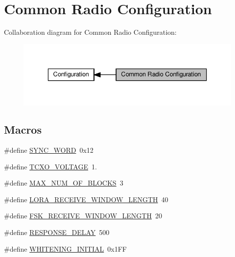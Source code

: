 \hypertarget{group__defines__radio__common__configuraiton}{}\section{Common Radio Configuration}
\label{group__defines__radio__common__configuraiton}
Collaboration diagram for Common Radio Configuration\+:
\nopagebreak
\begin{figure}[H]
\begin{center}
\leavevmode
\includegraphics[width=336pt]{group__defines__radio__common__configuraiton}
\end{center}
\end{figure}
\subsection*{Macros}
\begin{DoxyCompactItemize}
\item 
\#define \hyperlink{group__defines__radio__common__configuraiton_ga3e9af6b370e370158949ba1f4d064a38}{S\+Y\+N\+C\+\_\+\+W\+O\+RD}~0x12
\item 
\#define \hyperlink{group__defines__radio__common__configuraiton_gaed963c48ead7d4a77519f1d09cffa16c}{T\+C\+X\+O\+\_\+\+V\+O\+L\+T\+A\+GE}~1.
\item 
\#define \hyperlink{group__defines__radio__common__configuraiton_ga89986fbe657f799f601b5b92f7632ece}{M\+A\+X\+\_\+\+N\+U\+M\+\_\+\+O\+F\+\_\+\+B\+L\+O\+C\+KS}~3
\item 
\#define \hyperlink{group__defines__radio__common__configuraiton_ga3b4956886146ec23bf4177b7aef17b3d}{L\+O\+R\+A\+\_\+\+R\+E\+C\+E\+I\+V\+E\+\_\+\+W\+I\+N\+D\+O\+W\+\_\+\+L\+E\+N\+G\+TH}~40
\item 
\#define \hyperlink{group__defines__radio__common__configuraiton_ga6ecfb0a7dee19b5096beeafbc7289815}{F\+S\+K\+\_\+\+R\+E\+C\+E\+I\+V\+E\+\_\+\+W\+I\+N\+D\+O\+W\+\_\+\+L\+E\+N\+G\+TH}~20
\item 
\#define \hyperlink{group__defines__radio__common__configuraiton_ga897b727b895f7f0b151b7197abaeb1f6}{R\+E\+S\+P\+O\+N\+S\+E\+\_\+\+D\+E\+L\+AY}~500
\item 
\#define \hyperlink{group__defines__radio__common__configuraiton_ga9c4ea33b2371bca7b91866f44f4555b7}{W\+H\+I\+T\+E\+N\+I\+N\+G\+\_\+\+I\+N\+I\+T\+I\+AL}~0x1\+FF
\end{DoxyCompactItemize}



